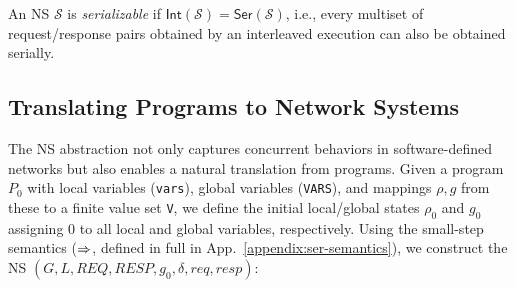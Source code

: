 An NS $\mathcal{S}$ is \emph{serializable} if \(\mathsf{Int}(\mathcal{S})=\mathsf{Ser}(\mathcal{S})\), i.e., every multiset of request/response pairs obtained by an interleaved execution can also be obtained serially.


%
%
%
%
%
%

\subsection{Translating \toolname{} Programs to Network Systems}
\label{subsec:SerToNsTranslation}
%
The NS abstraction not only captures concurrent behaviors in software-defined networks but also enables a natural translation from \toolname{} programs. 
Given a \toolname{} program \(P_0\) with local variables (\texttt{vars}), global variables (\texttt{VARS}), and mappings \(\rho,g\) from these to a finite value set \texttt{V}, we define the initial local/global states $\rho_0$ and $g_0$ assigning $0$ to all local and global variables, respectively. 
Using the small-step semantics ($\mathrel{\Rightarrow}$, defined in full in App.~\ref{appendix:ser-semantics}), we construct the NS $(G, L, \mathit{REQ}, \mathit{RESP}, g_0, \delta, \mathit{req}, \mathit{resp})$:

